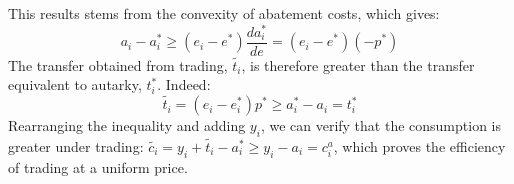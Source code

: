 \documentclass[12pt,english]{article}
\begin{document}
This results stems from the convexity of abatement costs, which gives: $$a_i - a^*_i \geq (e_i - e^*) \frac{da^*_i}{de} = (e_i - e^*) (-p^*)$$ 
The transfer obtained from trading, $\widetilde{t_i}$, is therefore greater than the transfer equivalent to autarky, $t^*_i$. Indeed: $$\widetilde{t_i} = (e_i - e^*_i ) p^* \geq a^*_i - a_i = t^*_i$$
Rearranging the inequality and adding $y_i$, we can verify that the consumption is greater under trading: %
$\widetilde{c_i} = y_i + \widetilde{t_i} - a^*_i \geq y_i - a_i = c^a_i$, which proves the efficiency of trading at a uniform price.





\end{document}
